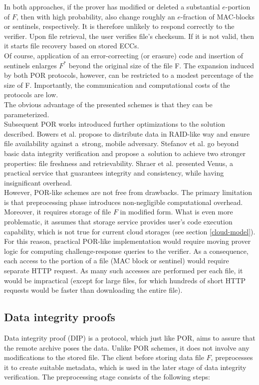 In both approaches, if the prover has modified or deleted a substantial 
$e$-portion of $F$, then with high probability, also change roughly an
$e$-fraction of MAC-blocks or sentinels, respectively. It is therefore unlikely
to respond correctly to the verifier. Upon file retrieval, the user verifies
file's checksum. If it is not valid, then it starts file recovery based on
stored ECCs.\\

Of course, application of an error-correcting (or erasure) code and insertion
of sentinels enlarges $F^{*}$ beyond the original size of the file F. The
expansion induced by both POR protocols, however, can be restricted to a modest
percentage of the size of F. Importantly, the communication and computational
costs of the protocols are low.\\

The obvious advantage of the presented schemes is that they can be
parameterized.\\

Subsequent POR works \cite{hail, venus, iris} introduced
further optimizations to the solution described. Bowers et al. \cite{hail} propose
to distribute data in RAID-like way and ensure file availability against a~strong,
mobile adversary. Stefanov et al. \cite{iris} go beyond basic data integrity verification
and propose a~solution to achieve two stronger properties: file freshness and retrievability.
Shraer et al. \cite{venus} presented Venus, a practical service that guarantees integrity 
and consistency, while having insignificant overhead.\\

However, POR-like schemes are not free from drawbacks. The primary limitation
is that preprocessing phase introduces non-negligible computational overhead.
Moreover, it requires storage of file $F$ in modified form. What is even more
problematic, it assumes that storage service provides user's code execution
capability, which is not true for current cloud storages 
(see section \ref{cloud-model}). For this reason, practical POR-like
implementation would require moving prover logic for computing 
challenge-response queries to the verifier. As a consequence, each access to
the portion of a file (MAC block or sentinel) would require separate HTTP
request. As many such accesses are performed per each file, it would be
impractical (except for large files, for which hundreds of short HTTP requests
would be faster than downloading the entire file).

\subsection{Data integrity proofs}
Data integrity proof (DIP) \cite{dip} is a protocol, which just like POR, aims
to assure that the remote archive poses the data. Unlike POR schemes, it does
not involve any modifications to the stored file. The client before storing
data file $F$, preprocesses it to create suitable metadata, which is used in
the later stage of data integrity verification. The preprocessing stage
consists of the following steps:

